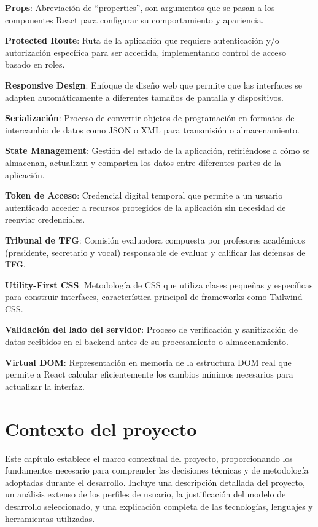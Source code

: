 \documentclass[12pt,a4paper,oneside]{report}
\begin{document}
\textbf{Props}: Abreviación de ``properties'', son argumentos que se
pasan a los componentes React para configurar su comportamiento y
apariencia.

\textbf{Protected Route}: Ruta de la aplicación que requiere
autenticación y/o autorización específica para ser accedida,
implementando control de acceso basado en roles.

\textbf{Responsive Design}: Enfoque de diseño web que permite que las
interfaces se adapten automáticamente a diferentes tamaños de pantalla y
dispositivos.

\textbf{Serialización}: Proceso de convertir objetos de programación en
formatos de intercambio de datos como JSON o XML para transmisión o
almacenamiento.

\textbf{State Management}: Gestión del estado de la aplicación,
refiriéndose a cómo se almacenan, actualizan y comparten los datos entre
diferentes partes de la aplicación.

\textbf{Token de Acceso}: Credencial digital temporal que permite a un
usuario autenticado acceder a recursos protegidos de la aplicación sin
necesidad de reenviar credenciales.

\textbf{Tribunal de TFG}: Comisión evaluadora compuesta por profesores
académicos (presidente, secretario y vocal) responsable de evaluar y
calificar las defensas de TFG.

\textbf{Utility-First CSS}: Metodología de CSS que utiliza clases
pequeñas y específicas para construir interfaces, característica
principal de frameworks como Tailwind CSS.

\textbf{Validación del lado del servidor}: Proceso de verificación y
sanitización de datos recibidos en el backend antes de su procesamiento
o almacenamiento.

\textbf{Virtual DOM}: Representación en memoria de la estructura DOM
real que permite a React calcular eficientemente los cambios mínimos
necesarios para actualizar la interfaz.

\chapter{Contexto del proyecto}\label{contexto-del-proyecto}
Este capítulo establece el marco contextual del proyecto, proporcionando los fundamentos necesario para comprender las decisiones técnicas y de metodología adoptadas durante el desarrollo. Incluye una descripción detallada del proyecto, un análisis extenso de los perfiles de usuario, la justificación del modelo de desarrollo seleccionado, y una explicación completa de las tecnologías, lenguajes y herramientas utilizadas.
\end{document}
